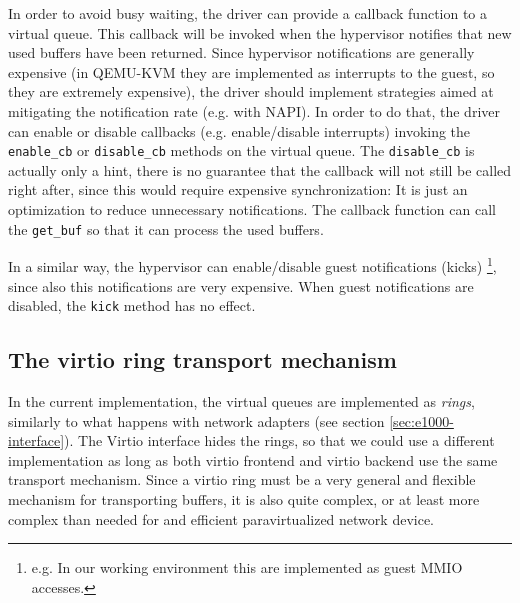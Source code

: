 \vspace{0.5cm}

In order to avoid busy waiting, the driver can provide a callback function to a virtual queue. This callback will be invoked when the
hypervisor notifies that new used buffers have been returned. Since hypervisor notifications are generally expensive (in QEMU-KVM they are 
implemented as interrupts to the guest, so they are extremely expensive), the driver should implement strategies aimed at mitigating the
notification rate (e.g. with NAPI). In order to do that, the driver can enable or disable callbacks (e.g. enable/disable interrupts) 
invoking the \texttt{enable\_cb} or \texttt{disable\_cb} methods on the virtual queue. The \texttt{disable\_cb} is actually only a hint,
there is no guarantee that the callback will not still be called right after, since this would require expensive synchronization: It is
just an optimization to reduce unnecessary notifications.
The callback function can call the \texttt{get\_buf} so that it can process the used buffers.

\vspace{0.5cm}

In a similar way, the hypervisor can enable/disable guest notifications (kicks) \footnote{e.g. In our working environment this are
implemented as guest MMIO accesses.}, since also this notifications are very expensive. When guest notifications are disabled,
the \texttt{kick} method has no effect.


\subsection{The virtio ring transport mechanism}
In the current implementation, the virtual queues are implemented as \emph{rings}, similarly to what happens with network adapters (see
section \ref{sec:e1000-interface}). The Virtio interface hides the rings, so that we could use a different implementation as
long as both virtio frontend and virtio backend use the same transport mechanism.
Since a virtio ring must be a very general and flexible mechanism for transporting buffers, it is also quite complex, or at least more
complex than needed for and efficient paravirtualized network device.

\vspace{0.5cm}

